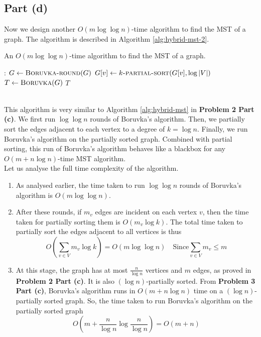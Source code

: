 \documentclass[9pt]{article}
\begin{document}
\subsection*{Part (d)}
Now we design another $O(m \log{\log{n}})$-time algorithm to find the MST of a graph. The algorithm
is described in Algorithm \ref{alg:hybrid-mst-2}.
\begin{algorithm}
    \caption{An $O(m \log{\log{n}})$-time algorithm to find the MST of a graph.}
    \label{alg:hybrid-mst-2}
    \begin{algorithmic}[1]
        :
                \State $G \gets \Call{Boruvka-round}{G}$
            \EndFor
                \State $G[v] \gets \Call{$k$-partial-sort}{G[v], \log{|V|}}$ 
            \EndFor
            \State $T \gets \Call{Boruvka}{G}$
            \State \Return $T$
        \EndProcedure
    \end{algorithmic}
\end{algorithm}
\vspace*{0pt} \\
This algorithm is very similar to Algorithm \ref{alg:hybrid-mst} in \textbf{Problem 2 Part (c)}. We
first run $\log{\log{n}}$ rounds of Boruvka's algorithm. Then, we partially sort the edges adjacent
to each vertex to a degree of $k = \log{n}$. Finally, we run Boruvka's algorithm on the partially
sorted graph. Combined with partial sorting, this run of Boruvka's algorithm behaves like a blackbox
for any $O(m + n \log{n})$-time MST algorithm. \\
Let us analyse the full time complexity of the algorithm.
\begin{enumerate}
    \item As analysed earlier, the time taken to run $\log{\log{n}}$ rounds of Boruvka's algorithm is
    $O(m \log{\log{n}})$.
    \item After these rounds, if $m_{v}$ edges are incident on each vertex $v$, then the time taken for
    partially sorting them is $O(m_{v} \log{k})$. The total time taken to partially sort the edges adjacent
    to all vertices is thus
    \begin{equation}
        \label{eq:partial-sort-time}
        O\left( \sum_{v \in V} m_{v} \log{k} \right) = O(m \log{\log{n}}) \quad \text{Since} \sum_{v \in V} m_{v} \leq m
    \end{equation}
    \item At this stage, the graph has at most $\frac{n}{\log{n}}$ vertices and $m$ edges, as proved
    in \textbf{Problem 2 Part (c)}. It is also $(\log{n})$-partially sorted. From \textbf{Problem 3 Part (c)},
    Boruvka's algorithm runs in $O(m + n \log{n})$ time on a $(\log{n})$-partially sorted graph. So,
    the time taken to run Boruvka's algorithm on the partially sorted graph
    \begin{equation}
        O\left( m + \frac{n}{\log{n}} \log{\frac{n}{\log{n}}} \right) = O(m + n)
    \end{equation}
\end{enumerate}
\end{document}

